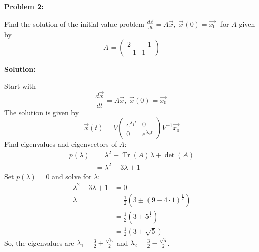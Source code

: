 \documentclass[12pt]{article}
\DeclareMathOperator{\Tr}{Tr}
\newenvironment{problem}[1]{
    \textbf{Problem #1:}
}{
    \rmfamily \vspace{1em}
}
\newenvironment{solution}{
    \textbf{Solution:}
    
}{
    
    \vspace{2em}
}
\begin{document}
\begin{problem}{2}
    Find the solution of the initial value problem \(\frac{d\vec{x}}{dt} = A\vec{x}, \; \vec{x}(0) = \vec{x_0} \; \) for \(A\) given by
    \[
        A = \begin{pmatrix}
            2 & -1 \\
            -1 & 1
        \end{pmatrix}
    \]
\end{problem}

\begin{solution}
    Start with
    \[
        \frac{d\vec{x}}{dt} = A\vec{x}, \; \vec{x}(0) = \vec{x_0} \;
    \]
    The solution is given by
    \[
        \vec{x}(t) = V\begin{pmatrix}
            e^{\lambda_1 t} & 0 \\
            0 & e^{\lambda_2 t}
        \end{pmatrix}V^{-1}\vec{x_0}
    \]
    Find eigenvalues and eigenvectors of \(A\):
    \[
        \begin{aligned}
            p(\lambda) &= \lambda^2 - \Tr(A)\lambda + \det(A) \\
            &= \lambda^2 - 3\lambda + 1
        \end{aligned}
    \]
    Set \(p(\lambda) = 0\) and solve for \(\lambda\):
    \[
        \begin{aligned}
            \lambda^2 - 3\lambda + 1 &= 0 \\
            \lambda &= \frac{1}{2} \left(3 \pm {(9 - 4 \cdot 1)}^{\frac{1}{2}}\right) \\
            &= \frac{1}{2} \left(3 \pm 5^{\frac{1}{2}}\right) \\
            &= \frac{1}{2} \left(3 \pm \sqrt{5}\right)
        \end{aligned}
    \]
    So, the eigenvalues are \(\lambda_1 = \frac{3}{2} + \frac{\sqrt{5}}{2}\) and \(\lambda_2 = \frac{3}{2} - \frac{\sqrt{5}}{2}\).


\end{solution}
\end{document}
